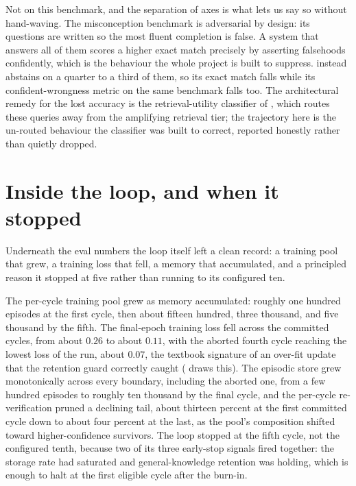 \begin{defence}
Not on this benchmark, and the separation of axes is what lets us say so without
hand-waving. The misconception benchmark is adversarial by design: its questions are
written so the most fluent completion is false. A system that answers all of them
scores a higher exact match precisely by asserting falsehoods confidently, which is the
behaviour the whole project is built to suppress. \caem{} instead abstains on a quarter
to a third of them, so its exact match falls while its confident-wrongness metric on
the same benchmark falls too. The architectural remedy for the lost accuracy is the
retrieval-utility classifier of , which routes these queries away from the
amplifying retrieval tier; the trajectory here is the un-routed behaviour the classifier
was built to correct, reported honestly rather than quietly dropped.
\end{defence}

\section{Inside the loop, and when it stopped}
\label{sec:traj-loop}

Underneath the eval numbers the loop itself left a clean record: a training pool that
grew, a training loss that fell, a memory that accumulated, and a principled reason it
stopped at five rather than running to its configured ten.

\begin{precise}
The per-cycle training pool grew as memory accumulated: roughly one hundred episodes at
the first cycle, then about fifteen hundred, three thousand, and five thousand by the
fifth. The final-epoch training loss fell across the committed cycles, from about
$0.26$ to about $0.11$, with the aborted fourth cycle reaching the lowest loss of the
run, about $0.07$, the textbook signature of an over-fit update that the retention guard
correctly caught ( draws this). The episodic store grew monotonically
across every boundary, including the aborted one, from a few hundred episodes to roughly
ten thousand by the final cycle, and the per-cycle re-verification pruned a declining
tail, about thirteen percent at the first committed cycle down to about four percent at
the last, as the pool's composition shifted toward higher-confidence survivors. The loop
stopped at the fifth cycle, not the configured tenth, because two of its three
early-stop signals fired together: the storage rate had saturated and general-knowledge
retention was holding, which is enough to halt at the first eligible cycle after the
burn-in.
\end{precise}

